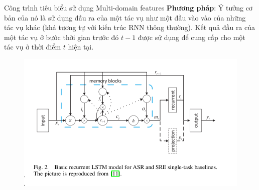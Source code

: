 \documentclass[notheorems, aspectratio=54]{beamer}
\begin{document}
\begin{frame}{Công trình tiêu biểu sử dụng Multi-domain features}
	\textbf{Phương pháp}: Ý tưởng cơ bản của nó là sử dụng đầu ra của một tác vụ như một đầu vào vào của những tác vụ khác (khá tương tự với kiến trúc RNN thông thường). Kết quả đầu ra của một tác vụ ở bước thời gian trước đó $t-1$ được sử dụng để cung cấp cho một tác vụ ở thời điểm $t$ hiện tại.
	\begin{figure}[H]
		\centering
		\includegraphics[width=0.75\linewidth]{images/basis-single-task-model.png}
		\label{fig:writing-thesis}
	\end{figure}
\end{frame}
\end{document}
